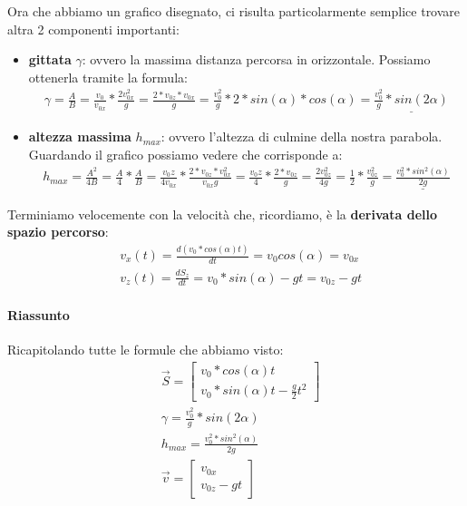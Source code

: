 				Ora che abbiamo un grafico disegnato, ci risulta particolarmente semplice trovare altra 2 componenti importanti:
				\begin{itemize}
					\item \textbf{gittata} $\gamma$: ovvero la massima distanza percorsa in orizzontale. Possiamo ottenerla tramite la formula:
					\begin{align*}
						\gamma = \frac{A}{B} = \frac{v_0}{v_{0x}}*\frac{2v_{0x}^2}{g} = \frac{2*v_{0z}*v_{0x}}{g}= \frac{v_0^2}{g}*2*sin(\alpha)*cos(\alpha) = \underline{\frac{v_0^2}{g}*sin(2\alpha)}
					\end{align*}
					\item \textbf{altezza massima} $h_{max}$: ovvero l'altezza di culmine della nostra parabola. Guardando il grafico possiamo vedere che corrisponde a:
					\begin{align*}
						h_{max} = \frac{A^2}{4B} = \frac{A}{4}*\frac{A}{B} = \frac{v_0z}{4v_{0x}}*\frac{2*v_{0z}*v_{0x}^2}{v_{0x}g} = \frac{v_0z}{4}*\frac{2*v_{0z}}{g} = \frac{2v_{0z}^2}{4g} = \frac{1}{2}*\frac{v_{0z}^2}{g} = \underline{\frac{v_0^2 * sin^2(\alpha)}{2g}}
					\end{align*}
				\end{itemize}
				Terminiamo velocemente con la velocità che, ricordiamo, è la \textbf{derivata dello spazio percorso}:
				\begin{align*}
					&v_x(t) = \frac{d(v_0*cos(\alpha)t)}{dt} = v_0 cos(\alpha) = v_{0x}\\
					&v_z(t) = \frac{d S_z}{dt} = v_0*sin(\alpha)-gt = v_{0z}-gt
				\end{align*}

				\paragraph{Riassunto}
					Ricapitolando tutte le formule che abbiamo visto:
					\begin{align*}
						&\vec{S}=
						\begin{bmatrix}
							v_0*cos(\alpha)t\\
							v_0*sin(\alpha)t-\frac{g}{2}t^2
						\end{bmatrix}\\
						&\gamma = \frac{v_0^2}{g}*sin(2\alpha)\\
						&h_{max} = \frac{v_0^2 * sin^2(\alpha)}{2g}\\
						&\vec{v}=
						\begin{bmatrix}
							v_{0x}\\
							v_{0z}-gt
						\end{bmatrix}\\
					\end{align*}
